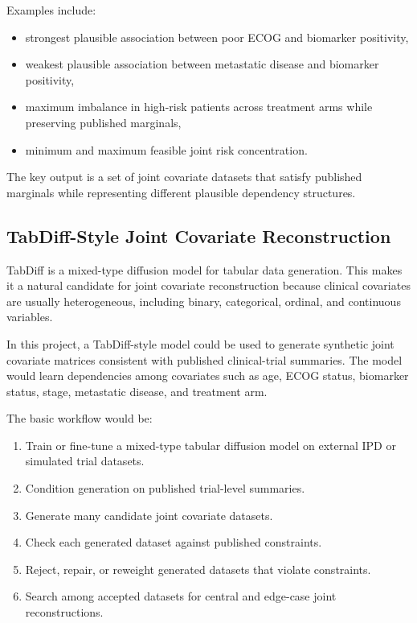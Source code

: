 \documentclass[11pt]{article}
\begin{document}
Examples include:

\begin{itemize}
\item strongest plausible association between poor ECOG and biomarker positivity,
\item weakest plausible association between metastatic disease and biomarker positivity,
\item maximum imbalance in high-risk patients across treatment arms while preserving published marginals,
\item minimum and maximum feasible joint risk concentration.
\end{itemize}

The key output is a set of joint covariate datasets that satisfy published marginals while representing different plausible dependency structures.

\subsection*{TabDiff-Style Joint Covariate Reconstruction}

TabDiff is a mixed-type diffusion model for tabular data generation. This makes it a natural candidate for joint covariate reconstruction because clinical covariates are usually heterogeneous, including binary, categorical, ordinal, and continuous variables.

In this project, a TabDiff-style model could be used to generate synthetic joint covariate matrices consistent with published clinical-trial summaries. The model would learn dependencies among covariates such as age, ECOG status, biomarker status, stage, metastatic disease, and treatment arm.

The basic workflow would be:

\begin{enumerate}
\item Train or fine-tune a mixed-type tabular diffusion model on external IPD or simulated trial datasets.
\item Condition generation on published trial-level summaries.
\item Generate many candidate joint covariate datasets.
\item Check each generated dataset against published constraints.
\item Reject, repair, or reweight generated datasets that violate constraints.
\item Search among accepted datasets for central and edge-case joint reconstructions.
\end{enumerate}
\end{document}
